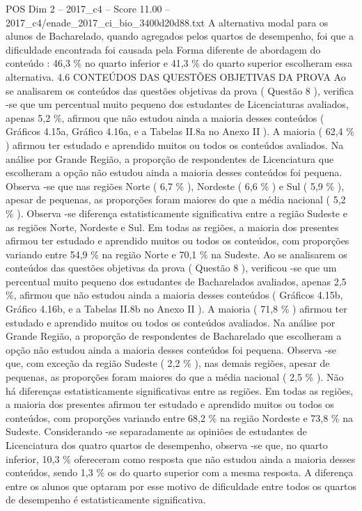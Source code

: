 \begin{textsample}{POS Dim 2 – 2017\_c4 – Score 11.00 – 2017\_c4/enade\_2017\_ci\_bio\_3400d20d88.txt}
A alternativa modal para os alunos de Bacharelado, quando agregados pelos quartos de desempenho, foi que a dificuldade encontrada foi causada pela Forma diferente de abordagem do conteúdo : 46,3 \% no quarto inferior e 41,3 \% do quarto superior escolheram essa alternativa. 4.6 CONTEÚDOS DAS QUESTÕES OBJETIVAS DA PROVA Ao se analisarem os conteúdos das questões objetivas da prova ( Questão 8 ), verifica -se que um percentual muito pequeno dos estudantes de Licenciaturas avaliados, apenas 5,2 \%, afirmou que não estudou ainda a maioria desses conteúdos ( Gráficos 4.15a, Gráfico 4.16a, e a Tabelas II.8a no Anexo II ).
A maioria ( 62,4 \% ) afirmou ter estudado e aprendido muitos ou todos os conteúdos avaliados.
Na análise por Grande Região, a proporção de respondentes de Licenciatura que escolheram a opção não estudou ainda a maioria desses conteúdos foi pequena.
Observa -se que nas regiões Norte ( 6,7 \% ), Nordeste ( 6,6 \% ) e Sul ( 5,9 \% ), apesar de pequenas, as proporções foram maiores do que a média nacional ( 5,2 \% ).
Observa -se diferença estatisticamente significativa entre a região Sudeste e as regiões Norte, Nordeste e Sul.
Em todas as regiões, a maioria dos presentes afirmou ter estudado e aprendido muitos ou todos os conteúdos, com proporções variando entre 54,9 \% na região Norte e 70,1 \% na Sudeste.
Ao se analisarem os conteúdos das questões objetivas da prova ( Questão 8 ), verificou -se que um percentual muito pequeno dos estudantes de Bacharelados avaliados, apenas 2,5 \%, afirmou que não estudou ainda a maioria desses conteúdos ( Gráficos 4.15b, Gráfico 4.16b, e a Tabelas II.8b no Anexo II ).
A maioria ( 71,8 \% ) afirmou ter estudado e aprendido muitos ou todos os conteúdos avaliados.
Na análise por Grande Região, a proporção de respondentes de Bacharelado que escolheram a opção não estudou ainda a maioria desses conteúdos foi pequena.
Observa -se que, com exceção da região Sudeste ( 2,2 \% ), nas demais regiões, apesar de pequenas, as proporções foram maiores do que a média nacional ( 2,5 \% ).
Não há diferenças estatisticamente significativas entre as regiões.
Em todas as regiões, a maioria dos presentes afirmou ter estudado e aprendido muitos ou todos os conteúdos, com proporções variando entre 68,2 \% na região Nordeste e 73,8 \% na Sudeste.
Considerando -se separadamente as opiniões de estudantes de Licenciatura dos quatro quartos de desempenho, observa -se que, no quarto inferior, 10,3 \% ofereceram como resposta que não estudou ainda a maioria desses conteúdos, sendo 1,3 \% os do quarto superior com a mesma resposta.
A diferença entre os alunos que optaram por esse motivo de dificuldade entre todos os quartos de desempenho é estatisticamente significativa.

\end{textsample}
